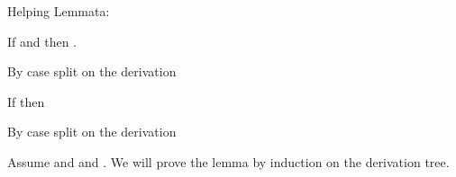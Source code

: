 Helping Lemmata:
\begin{lemma}\label{lemma:wftypes}
If  and \iswellformed{}{\Gamma} then \iswellformed{\Gamma}{\tau}.
\end{lemma}
\begin{proofsketch}
By case split on the derivation \iswellformed{\Gamma}{\tau}
\end{proofsketch}
\begin{lemma}\label{lemma:eval}
If  then
\end{lemma}
\begin{proofsketch}
By case split on the derivation 
\end{proofsketch}

Assume  and  and . 
We will prove the lemma by induction on the derivation tree. 
